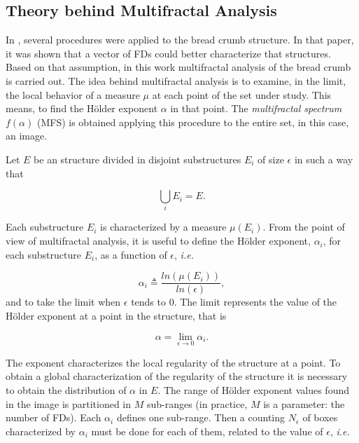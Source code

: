 \documentclass[a4paper,10pt]{article}
\begin{document}
\subsection{Theory behind Multifractal Analysis}
\label{sec:4}

In \cite{Gonzales2008}, several procedures were applied to the bread crumb structure. In that paper, it was shown that a vector of FDs could better characterize that structures. Based on that assumption, in this work multifractal analysis of the bread crumb is carried out. The idea behind multifractal analysis is to examine, in the limit, the local behavior of a measure $\mu$ at each point of the set under study. This means, to find the H\"older exponent $\alpha$ in that point. The {\em multifractal spectrum} $f(\alpha)$ (MFS) is obtained applying this procedure to the entire set, in this case, an image.

Let $E$ be an structure divided in disjoint substructures $E_{i}$ of size $\epsilon$ in such a way that 

\begin{equation}
\displaystyle\bigcup_{i}E_{i} = E.
\end{equation}

Each substructure $E_{i}$ is characterized by a measure $\mu(E_{i})$. From the point of view of multifractal analysis, it is useful to define the H\"older exponent, $\alpha_{i}$, for each substructure $E_{i}$, as a function of $\epsilon$, {\em i.e.}


\begin{equation}
\alpha_{i} \triangleq \frac{ln(\mu(E_{i}))}{ln(\epsilon)},
\label{eqn:eqn4}
\end{equation}
\noindent
and to take the limit when $\epsilon$ tends to $0$. The limit represents the value of the H\"older exponent at a point in the structure, that is

\begin{equation}
\alpha = \lim_{\epsilon\to0}{\alpha_{i}}.
\label{eqn:eqn5}
\end{equation}

The exponent characterizes the local regularity of the structure at a point. To obtain a global characterization of the regularity of the structure it is necessary to obtain the distribution of $\alpha$ in $E$. The range of H\"older exponent values found in the image is partitioned in $M$ sub-ranges (in practice, $M$ is a parameter: the number of FDs). Each $\alpha_{i}$ defines one sub-range. Then a counting $N_{\epsilon}$ of boxes characterized by $\alpha_{i}$ must be done for each of them, related to the value of $\epsilon$, {\em i.e.}
\end{document}
